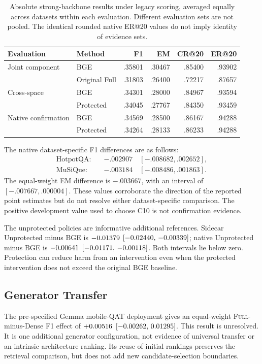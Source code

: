\documentclass[11pt,a4paper]{article}
\newcommand{\full}{\textsc{Full}\xspace}
\begin{document}
\begin{table}[t]
\centering\small
\begin{tabular}{@{}llrrrr@{}}
\toprule
Evaluation & Method & F1 & EM & CR@20 & ER@20\\
\midrule
Joint component & BGE & .35801 & .30467 & .85400 & .93902\\
 & Original Full & .31803 & .26400 & .72217 & .87657\\
Cross-space & BGE & .34301 & .28000 & .84967 & .93594\\
 & Protected & .34045 & .27767 & .84350 & .93459\\
Native confirmation & BGE & .34569 & .28500 & .86167 & .94288\\
 & Protected & .34264 & .28133 & .86233 & .94288\\
\bottomrule
\end{tabular}
\caption{Absolute strong-backbone results under legacy scoring, averaged
equally across datasets within each evaluation. Different evaluation sets
are not pooled. The identical rounded native ER@20 values do not imply
identity of evidence sets.}
\label{tab:strong}
\end{table}

The native dataset-specific F1 differences are as follows:
\begin{align*}
\text{HotpotQA:}\quad &-.002907\quad [-.008682,.002652],\\
\text{MuSiQue:}\quad &-.003184\quad [-.008486,.001863].
\end{align*}
The equal-weight EM difference is $-.003667$, with an interval of
$[-.007667,.000004]$. These values corroborate the direction
of the reported point estimates but do not resolve either dataset-specific
comparison. The positive development value used to choose C10 is not
confirmation evidence.

The unprotected policies are informative additional references. Sidecar
Unprotected minus BGE is $-0.01379$
$[-0.02440,\,-0.00339]$; native Unprotected minus BGE is
$-0.00641$ $[-0.01171,\,-0.00118]$.
Both intervals lie below zero. Protection can reduce harm from an
intervention even when the protected intervention does not exceed the
original BGE baseline.

\subsection{Generator Transfer}
The pre-specified Gemma mobile-QAT deployment gives an equal-weight
\full-minus-Dense F1 effect of $+0.00516$ $[-0.00262,\,0.01295]$.
This result is unresolved. It is one additional generator configuration,
not evidence of universal transfer or an intrinsic architecture ranking.
Its reuse of initial rankings preserves the retrieval comparison, but does
not add new candidate-selection boundaries.
\end{document}

